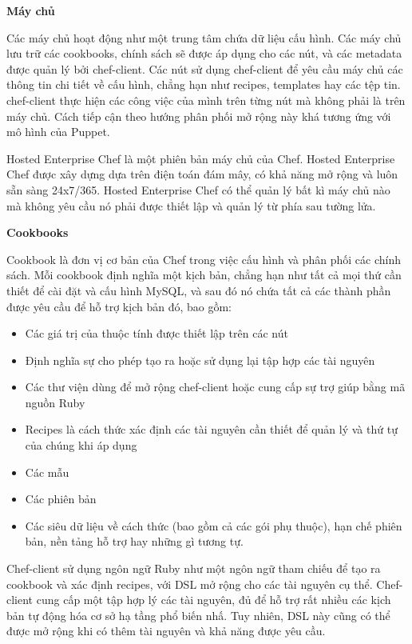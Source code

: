 \textbf{\large Máy chủ}


Các máy chủ hoạt động như một trung tâm chứa dữ liệu cấu hình. Các máy chủ lưu trữ các cookbooks, chính sách sẽ được áp dụng cho các nút, và các metadata được quản lý bởi chef-client. Các nút sử dụng chef-client để yêu cầu máy chủ các thông tin chi tiết về cấu hình, chẳng hạn như recipes, templates hay các tệp tin. chef-client thực hiện các công việc của mình trên từng nút mà không phải là trên máy chủ. Cách tiếp cận theo hướng phân phối mở rộng này khá tương ứng với mô hình của Puppet.

Hosted Enterprise Chef là một phiên bản máy chủ của Chef. Hosted Enterprise Chef được xây dựng dựa trên điện toán đám mây, có khả năng mở rộng và luôn sẵn sàng 24x7/365. Hosted Enterprise Chef có thể quản lý bất kì máy chủ nào mà không yêu cầu nó phải được thiết lập và quản lý từ phía sau tường lửa.

\textbf{\large Cookbooks}


Cookbook là đơn vị cơ bản của Chef trong việc cấu hình và phân phối các chính sách. Mỗi cookbook định nghĩa một kịch bản, chẳng hạn như tất cả mọi thứ cần thiết để cài đặt và cấu hình MySQL, và sau đó nó chứa tất cả các thành phần được yêu cầu để hỗ trợ kịch bản đó, bao gồm:

\begin{itemize}
\item Các giá trị của thuộc tính được thiết lập trên các nút
\item Định nghĩa sự cho phép tạo ra hoặc sử dụng lại tập hợp các tài nguyên
\item Các thư viện dùng để mở rộng chef-client hoặc cung cấp sự trợ giúp bằng mã nguồn Ruby
\item Recipes là cách thức xác định các tài nguyên cần thiết để quản lý và thứ tự của chúng khi áp dụng
\item Các mẫu
\item Các phiên bản
\item Các siêu dữ liệu về cách thức (bao gồm cả các gói phụ thuộc), hạn chế phiên bản, nền tảng hỗ trợ hay những gì tương tự.
\end{itemize}

Chef-client sử dụng ngôn ngữ Ruby như một ngôn ngữ tham chiếu để tạo ra cookbook và xác định recipes, với DSL mở rộng cho các tài nguyên cụ thể. Chef-client cung cấp một tập hợp lý các tài nguyên, đủ để hỗ trợ rất nhiều các kịch bản tự động hóa cơ sở hạ tầng phổ biến nhấ. Tuy nhiên, DSL này cũng có thể được mở rộng khi có thêm tài nguyên và khả năng được yêu cầu.

